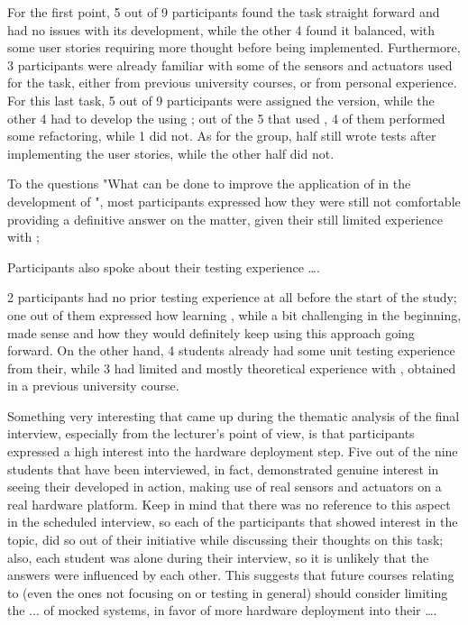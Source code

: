 For the first point, 5 out of 9 participants found the task straight forward and had no issues with its development, while the other 4 found it balanced, with some user stories requiring more thought before being implemented. Furthermore, 3 participants were already familiar with some of the sensors and actuators used for the task, either from previous university courses, or from personal experience.
For this last task, 5 out of 9 participants were assigned the \tdd version, while the other 4 had to develop the \es using \notdd; out of the 5 that used \tdd, 4 of them performed some refactoring, while 1 did not. As for the \notdd group, half still wrote tests after implementing the user stories, while the other half did not.

To the questions "What can be done to improve the application of \tdd in the development of \ess", most participants expressed how they were still not comfortable providing a definitive answer on the matter, given their still limited experience with \tdd;

Participants also spoke about their testing experience \dots . 

2 participants had no prior testing experience at all before the start of the study; one out of them expressed how learning \tdd, while a bit challenging in the beginning, made sense and how they would definitely keep using this approach going forward. On the other hand, 4 students already had some unit testing experience from their, while 3 had limited and mostly theoretical experience with \tdd, obtained in a previous university course.

Something very interesting that came up during the thematic analysis of the final interview, especially from the lecturer's point of view, is that participants expressed a high interest into the hardware deployment step.
Five out of the nine students that have been interviewed, in fact, demonstrated genuine interest in seeing their developed \es in action, making use of real sensors and actuators on a real hardware platform. Keep in mind that there was no reference to this aspect in the scheduled interview, so each of the participants that showed interest in the topic, did so out of their initiative while discussing their thoughts on this task; also, each student was alone during their interview, so it is unlikely that the answers were influenced by each other.
This suggests that future courses relating to \ess (even the ones not focusing on \tdd or \ess testing in general) should consider limiting the ... of mocked systems, in favor of more hardware deployment into their \dots. 
